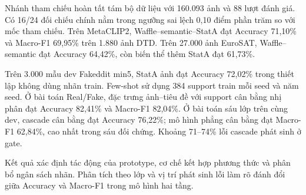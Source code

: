 \documentclass[12pt,a4paper]{article}
\numberwithin{figure}{section}
\numberwithin{table}{section}
\numberwithin{equation}{section}
\begin{document}
Nhánh tham chiếu hoàn tất tám bộ dữ liệu với 160.093 ảnh và 88 lượt đánh giá. Có 16/24 đối chiếu chính nằm trong ngưỡng sai lệch 0,10 điểm phần trăm so với mốc tham chiếu. Trên MetaCLIP2, Waffle--semantic--StatA đạt Accuracy 71,10\% và Macro-F1 69,95\% trên 1.880 ảnh DTD. Trên 27.000 ảnh EuroSAT, Waffle--semantic đạt Accuracy 64,42\%, còn biến thể thêm StatA đạt 61,73\%.

Trên 3.000 mẫu dev Fakeddit min5, StatA ảnh đạt Accuracy 72,02\% trong thiết lập không dùng nhãn train. Few-shot sử dụng 384 support train mỗi seed và năm seed. Ở bài toán Real/Fake, đặc trưng ảnh--tiêu đề với support cân bằng nhị phân đạt Accuracy 82,41\% và Macro-F1 82,04\%. Ở bài toán sáu lớp trên cùng dev, cascade cân bằng đạt Accuracy 76,22\%; mô hình phẳng cân bằng đạt Macro-F1 62,84\%, cao nhất trong sáu đối chứng. Khoảng 71--74\% lỗi cascade phát sinh ở gate.

Kết quả xác định tác động của prototype, cơ chế kết hợp phương thức và phân bổ ngân sách nhãn. Phân tích theo lớp và vị trí phát sinh lỗi làm rõ đánh đổi giữa Accuracy và Macro-F1 trong mô hình hai tầng.
\clearpage


\tableofcontents
\clearpage
{}
{}
\listoffigures
\clearpage
{}
{}
\listoftables
\clearpage
{}
{}
\end{document}
